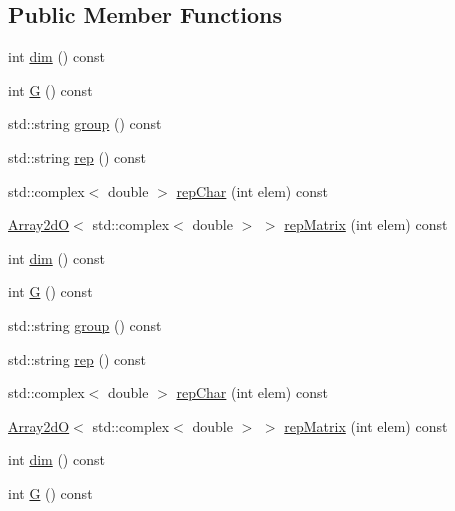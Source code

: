 \subsection*{Public Member Functions}
\begin{DoxyCompactItemize}
\item 
int \mbox{\hyperlink{structHadron_1_1C4nnmERep_ae5381e6e188b515505fbd5d6a7c6e7c9}{dim}} () const
\item 
int \mbox{\hyperlink{structHadron_1_1C4nnmERep_aeebb3eed0a37633aded692d6d5929f84}{G}} () const
\item 
std\+::string \mbox{\hyperlink{structHadron_1_1C4nnmERep_a45a936a694de501cfdb433b97302755a}{group}} () const
\item 
std\+::string \mbox{\hyperlink{structHadron_1_1C4nnmERep_af7b1046412f5b815c19810b47eb8686d}{rep}} () const
\item 
std\+::complex$<$ double $>$ \mbox{\hyperlink{structHadron_1_1C4nnmERep_af3cb7f743630f5a14e38a10ee61dc9ff}{rep\+Char}} (int elem) const
\item 
\mbox{\hyperlink{classADAT_1_1Array2dO}{Array2dO}}$<$ std\+::complex$<$ double $>$ $>$ \mbox{\hyperlink{structHadron_1_1C4nnmERep_adb5804895fb825dd5a5fde9c417e5cb8}{rep\+Matrix}} (int elem) const
\item 
int \mbox{\hyperlink{structHadron_1_1C4nnmERep_ae5381e6e188b515505fbd5d6a7c6e7c9}{dim}} () const
\item 
int \mbox{\hyperlink{structHadron_1_1C4nnmERep_aeebb3eed0a37633aded692d6d5929f84}{G}} () const
\item 
std\+::string \mbox{\hyperlink{structHadron_1_1C4nnmERep_a45a936a694de501cfdb433b97302755a}{group}} () const
\item 
std\+::string \mbox{\hyperlink{structHadron_1_1C4nnmERep_af7b1046412f5b815c19810b47eb8686d}{rep}} () const
\item 
std\+::complex$<$ double $>$ \mbox{\hyperlink{structHadron_1_1C4nnmERep_af3cb7f743630f5a14e38a10ee61dc9ff}{rep\+Char}} (int elem) const
\item 
\mbox{\hyperlink{classADAT_1_1Array2dO}{Array2dO}}$<$ std\+::complex$<$ double $>$ $>$ \mbox{\hyperlink{structHadron_1_1C4nnmERep_adb5804895fb825dd5a5fde9c417e5cb8}{rep\+Matrix}} (int elem) const
\item 
int \mbox{\hyperlink{structHadron_1_1C4nnmERep_ae5381e6e188b515505fbd5d6a7c6e7c9}{dim}} () const
\item 
int \mbox{\hyperlink{structHadron_1_1C4nnmERep_aeebb3eed0a37633aded692d6d5929f84}{G}} () const
\item 

\end{DoxyCompactItemize}
